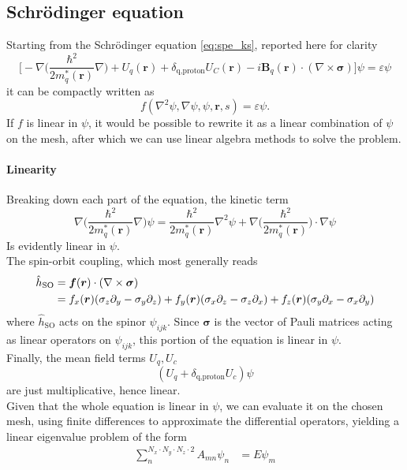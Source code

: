 \subsection{Schr\"odinger equation}
Starting from the Schr\"odinger equation \ref{eq:spe_ks}, reported here for clarity
\begin{equation*}
    \bigg[-\nabla\bigg(\frac{\hbar^2}{2m^{*}_q(\mathbf r)}\nabla \bigg) + U_q(\mathbf r) + \delta_{\text{q,proton}}U_C(\mathbf r)-i\mathbf B_q(\mathbf r)\cdot(\nabla \times \boldsymbol\sigma) \bigg]\psi=\varepsilon\psi
\end{equation*}
it can be compactly written as
\begin{equation}
    \label{eq:pde} f(\nabla^2 \psi, \nabla \psi, \psi, \bm r, s) = \varepsilon\psi.
\end{equation}
If $f$ is linear in $\psi$, it would be possible to rewrite it as a linear combination of $\psi$ on the mesh, after which we can use linear algebra methods to solve the problem.
\paragraph{Linearity}
Breaking down each part of the equation, the kinetic term
\begin{equation}
\label{eq:kin_lin_dim}
\nabla\bigg(\frac{\hbar^2}{2m^{*}_q(\mathbf r)}\nabla \bigg)\psi = \frac{\hbar^2}{2m^{*}_q(\mathbf r)} \nabla^2\psi + \nabla\bigg(\frac{\hbar^2}{2m^{*}_q(\mathbf r)}\bigg)\cdot \nabla\psi
\end{equation}
Is evidently linear in $\psi$. 
\\The spin-orbit coupling, which most generally reads
\begin{align*}
    \hat {{h}}_{\text{SO}}&=\bm f (\bm r )\cdot (\nabla \times \boldsymbol{\sigma} ) 
    \\&=f_x(\bm r)(\sigma_z\partial_y - \sigma_y\partial_z) + f_y(\bm r)(\sigma_x\partial_z - \sigma_z\partial_x) + f_z(\bm r)(\sigma_y\partial_x - \sigma_x\partial_y)
\end{align*}
where $\hat {h}_\text{SO}$ acts on the spinor $\psi_{ijk}$. Since $\bm \sigma$ is the vector of Pauli matrices acting as linear operators on $\psi_{ijk}$, this portion of the equation is linear in $\psi$.
\\Finally, the mean field terms $U_q, U_c$ 
\begin{equation*}
    (U_q + \delta_{\text{q,proton}}U_c)\psi
\end{equation*}
are just multiplicative, hence linear.
\\Given that the whole equation is linear in $\psi$, we can evaluate it on the chosen mesh, using finite differences to approximate the differential operators, yielding a linear eigenvalue problem of the form
\begin{align}
    \sum_n^{N_x\cdot N_y\cdot N_z \cdot 2} A_{mn}\psi_{n} &= E\psi_m
\end{align}
